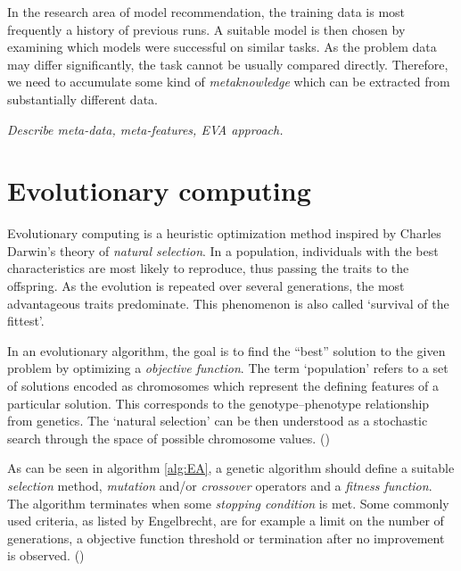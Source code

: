 In the research area of model recommendation, the training data is most
frequently a history of previous runs. A suitable model is then chosen by
examining which models were successful on similar tasks. As the problem data
may differ significantly, the task cannot be usually compared directly.
Therefore, we need to accumulate some kind of \emph{metaknowledge} which
can be extracted from substantially different data.

\textit{Describe meta-data, meta-features, EVA approach.}

\section{Evolutionary computing}
Evolutionary computing is a heuristic optimization method inspired by 
Charles Darwin's theory of \emph{natural selection}. \cite{darwin} In 
a population, individuals with the best characteristics are most likely
to reproduce, thus passing the traits to the offspring. As the evolution 
is repeated over several generations, the most advantageous traits 
predominate. This phenomenon is also called `survival of the fittest'. 

In an evolutionary algorithm, the goal is to find the ``best'' solution 
to the given problem by optimizing a \emph{objective function}. The term
`population' refers to a set of solutions encoded as chromosomes which 
represent the defining features of a particular solution. This corresponds
to the genotype--phenotype relationship from genetics. The `natural selection'
can be then understood as a stochastic search through the space of possible 
chromosome values. 
(\cite{Engelbrecht:2007:CII:1557464}) 


As can be seen in algorithm \ref{alg:EA}, a genetic algorithm should 
define a suitable \emph{selection} method, \emph{mutation} and/or 
\emph{crossover} operators and a \emph{fitness function}.
The algorithm terminates when some \emph{stopping condition} is met. 
Some commonly used criteria, as listed by Engelbrecht, are for example 
a limit on the number of generations, a objective function threshold or
termination after no improvement is observed.
(\citep{Engelbrecht:2007:CII:1557464})


